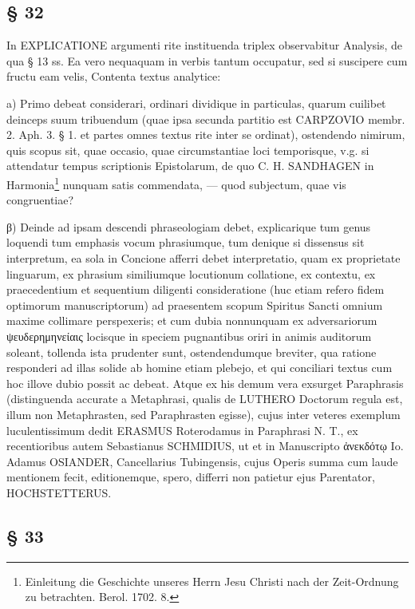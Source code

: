 \subsection{§ 32}

In EXPLICATIONE argumenti rite instituenda triplex observabitur Analysis, de qua § 13 ss. Ea vero nequaquam in verbis tantum occupatur, sed si suscipere cum fructu eam velis, Contenta textus analytice:

a) Primo debeat considerari, ordinari dividique in particulas, quarum cuilibet deinceps suum tribuendum (quae ipsa secunda partitio est CARPZOVIO membr. 2. Aph. 3. § 1. et partes omnes textus rite inter se ordinat), ostendendo nimirum, quis scopus sit, quae occasio, quae circumstantiae loci temporisque, v.g. si attendatur tempus scriptionis Epistolarum, de quo C. H. SANDHAGEN in Harmonia\footnote{Einleitung die Geschichte unseres Herrn Jesu Christi nach der Zeit-Ordnung zu betrachten. Berol. 1702. 8.}
nunquam satis commendata, — quod subjectum, quae vis congruentiae?

β) Deinde ad ipsam descendi phraseologiam debet, explicarique tum genus loquendi tum emphasis vocum phrasiumque, tum denique si dissensus sit interpretum, ea sola in Concione afferri debet interpretatio, quam ex proprietate linguarum, ex phrasium similiumque locutionum collatione, ex contextu, ex praecedentium et sequentium diligenti consideratione (huc etiam refero fidem optimorum manuscriptorum) ad praesentem scopum Spiritus Sancti omnium maxime collimare perspexeris; et cum dubia nonnunquam ex adversariorum ψευδερημηνείαις locisque in speciem pugnantibus oriri in animis auditorum soleant, tollenda ista prudenter sunt, ostendendumque breviter, qua ratione responderi ad illas solide ab homine etiam plebejo, et qui conciliari textus cum hoc illove dubio possit ac debeat. Atque ex his demum vera exsurget Paraphrasis (distinguenda accurate a Metaphrasi, qualis de LUTHERO Doctorum regula est, illum non Metaphrasten, sed Paraphrasten egisse), cujus inter veteres exemplum luculentissimum dedit ERASMUS Roterodamus in Paraphrasi N. T., ex recentioribus autem Sebastianus SCHMIDIUS, ut et in Manuscripto ἀνεκδότῳ Io. Adamus OSIANDER, Cancellarius Tubingensis, cujus Operis summa cum laude mentionem fecit, editionemque, spero, differri non patietur ejus Parentator, HOCHSTETTERUS.

\subsection{§ 33}

